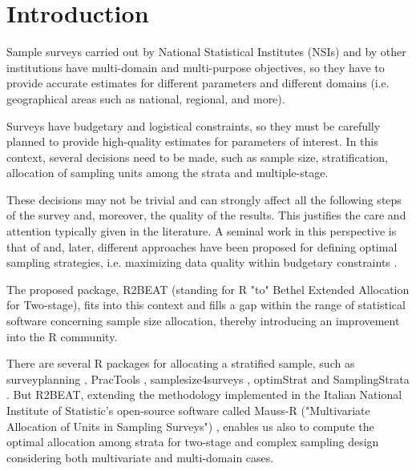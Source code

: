 \section{Introduction}
Sample surveys carried out by National Statistical Institutes (NSIs) and by other institutions have multi-domain and multi-purpose objectives, so they have to provide accurate estimates for different parameters and different domains (i.e. geographical areas such as national, regional, and more).

Surveys have budgetary and logistical constraints, so they must be carefully planned to provide high-quality estimates for parameters of interest.
In this context, several decisions need to be made, such as sample size, stratification, allocation of sampling units among the strata and multiple-stage.

These decisions may not be trivial and can strongly affect all the following steps of the survey and, moreover, the quality of the results.
This justifies the care and attention typically given in the literature.
A seminal work in this perspective is that of \citet{kish1965survey} and, later, different approaches have been proposed for defining optimal sampling strategies, i.e. maximizing data quality within budgetary constraints \citep[see among the others][]{cochran1977sampling}. 


The proposed package, R2BEAT (standing for {R} "to" Bethel Extended Allocation for Two-stage), fits into this context and fills a gap within the range of statistical software concerning sample size allocation, thereby introducing an improvement into the R community. 

There are several {R} packages for allocating a stratified sample, such as {surveyplanning} \citep{surveyplanning}, {PracTools} \citep{practools}, {samplesize4surveys} \citep{Rojas:2020}, {optimStrat} \citep{optimstrat} and {SamplingStrata} \citep{barcaroli2014samplingstrata}.
But R2BEAT, extending the methodology implemented in the Italian National Institute of Statistic's open-source software called {Mauss-R} ("Multivariate Allocation of Units in Sampling Surveys") \citep{maussr}, enables us also to compute the optimal allocation among strata for two-stage and complex sampling design considering both multivariate and multi-domain cases.

